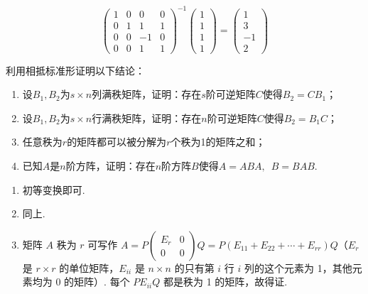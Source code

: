 \begin{exercise}
\begin{exgroup}
\begin{answer}
\begin{enumerate}
\[\begin{pmatrix}
                              1 & 0 & 0  & 0 \\
                              0 & 1 & 1  & 1 \\
                              0 & 0 & -1 & 0 \\
                              0 & 0 & 1  & 1
                          \end{pmatrix}^{-1} \begin{pmatrix} 1 \\ 1 \\ 1 \\ 1 \end{pmatrix} = \begin{pmatrix} 1 \\ 3 \\ -1 \\ 2 \end{pmatrix} \]
            \end{enumerate}
        \end{answer}

        \item 利用相抵标准形证明以下结论：
        \begin{enumerate}
            \item 设$B_1,B_2$为$s \times n$列满秩矩阵，证明：存在$s$阶可逆矩阵$C$使得$B_2=CB_1$；

            \item 设$B_1,B_2$为$s \times n$行满秩矩阵，证明：存在$n$阶可逆矩阵$C$使得$B_2=B_1C$；

            \item 任意秩为$r$的矩阵都可以被分解为$r$个秩为1的矩阵之和；

            \item 已知$A$是$n$阶方阵，证明：存在$n$阶方阵$B$使得$A=ABA,\enspace B=BAB$.
        \end{enumerate}
        \begin{answer}
            \begin{enumerate}
                \item 初等变换即可.

                \item 同上.

                \item 矩阵 $A$ 秩为 $r$ 可写作 $A=P\begin{pmatrix}E_r & 0 \\ 0 & 0\end{pmatrix}Q = P(E_{11}+E_{22}+\cdots+E_{rr})Q$（$E_r$ 是 $r\times r$ 的单位矩阵，$E_{ii}$ 是 $n\times n$ 的只有第 $i$ 行 $i$ 列的这个元素为 1，其他元素均为 0 的矩阵）. 每个 $PE_{ii}Q$ 都是秩为 1 的矩阵，故得证.


\end{enumerate}
\end{answer}
\end{exgroup}
\end{exercise}
